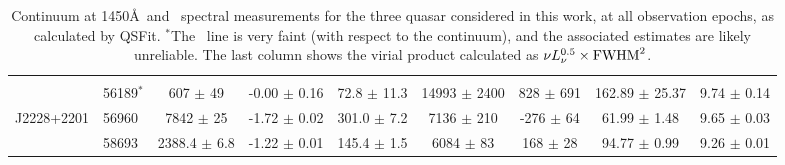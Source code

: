 \begin{table*}
\begin{centering}
\begin{tabular}{l  l | c c | c c c c | c}
                      &             &                               &                                &                              &                                 &                            &                                   &                            \\
                     & 56189$^*$ & 607 $\pm$ 49  &  -0.00 $\pm$ 0.16 &  72.8  $\pm$ 11.3 & 14993 $\pm$ 2400 &  828 $\pm$ 691   & 162.89 $\pm$ 25.37  &  9.74 $\pm$ 0.14\\  
 J2228+2201 & 56960   & 7842 $\pm$ 25     &  -1.72 $\pm$ 0.02 & 301.0  $\pm$ 7.2  &  7136 $\pm$  210   & -276 $\pm$  64   &  61.99 $\pm$  1.48  &    9.65 $\pm$ 0.03\\ 
              & 58693   & 2388.4 $\pm$ 6.8 &  -1.22 $\pm$ 0.01 & 145.4  $\pm$ 1.5  &  6084 $\pm$   83    &   168 $\pm$  28   &  94.77 $\pm$  0.99  &    9.26 $\pm$ 0.01\\
      \hline
      \hline
    \end{tabular}
    \caption{Continuum at 1450\AA\ and \civ\ spectral measurements for the
      three quasar considered in this work, at all observation epochs, as
      calculated by QSFit. $^{*}$The \civ\ line is very faint (with respect
      to the continuum), and the associated estimates are likely unreliable.
      The last column shows the virial product calculated as $\nu
      L_{\nu}^{0.5} \times {\rm FWHM}^2$.}
    \label{tab:QSFit-results}
  \end{centering}
\end{table*}